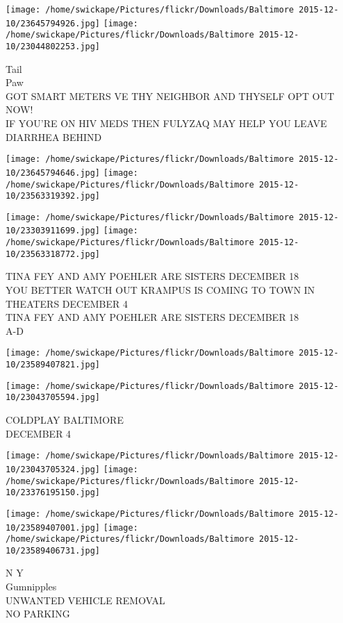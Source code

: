 \documentclass[10pt,letterpaper]{article}
\begin{document}
\texttt{[image: /home/swickape/Pictures/flickr/Downloads/Baltimore 2015-12-10/23645794926.jpg]}
\texttt{[image: /home/swickape/Pictures/flickr/Downloads/Baltimore 2015-12-10/23044802253.jpg]}

Tail\\
Paw\\
GOT SMART METERS VE THY NEIGHBOR AND THYSELF OPT OUT NOW!\\
IF YOU'RE ON HIV MEDS THEN FULYZAQ MAY HELP YOU LEAVE DIARRHEA BEHIND
\pagebreak

\texttt{[image: /home/swickape/Pictures/flickr/Downloads/Baltimore 2015-12-10/23645794646.jpg]}
\texttt{[image: /home/swickape/Pictures/flickr/Downloads/Baltimore 2015-12-10/23563319392.jpg]}

\texttt{[image: /home/swickape/Pictures/flickr/Downloads/Baltimore 2015-12-10/23303911699.jpg]}
\texttt{[image: /home/swickape/Pictures/flickr/Downloads/Baltimore 2015-12-10/23563318772.jpg]}

TINA FEY AND AMY POEHLER ARE SISTERS DECEMBER 18\\
YOU BETTER WATCH OUT KRAMPUS IS COMING TO TOWN IN THEATERS DECEMBER 4\\
TINA FEY AND AMY POEHLER ARE SISTERS DECEMBER 18\\
A{-}D
\pagebreak

\texttt{[image: /home/swickape/Pictures/flickr/Downloads/Baltimore 2015-12-10/23589407821.jpg]}

\vspace{0.25in}
\texttt{[image: /home/swickape/Pictures/flickr/Downloads/Baltimore 2015-12-10/23043705594.jpg]}

COLDPLAY BALTIMORE\\
DECEMBER 4
\pagebreak

\texttt{[image: /home/swickape/Pictures/flickr/Downloads/Baltimore 2015-12-10/23043705324.jpg]}
\texttt{[image: /home/swickape/Pictures/flickr/Downloads/Baltimore 2015-12-10/23376195150.jpg]}

\texttt{[image: /home/swickape/Pictures/flickr/Downloads/Baltimore 2015-12-10/23589407001.jpg]}
\texttt{[image: /home/swickape/Pictures/flickr/Downloads/Baltimore 2015-12-10/23589406731.jpg]}

N Y\\
Gumnipples\\
UNWANTED VEHICLE REMOVAL\\
NO PARKING
\pagebreak
\end{document}
